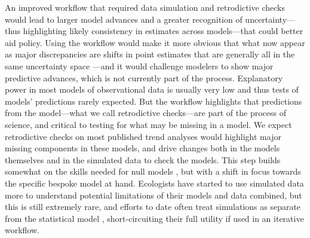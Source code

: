 \documentclass[11pt]{article}
\begin{document}
An improved workflow that required data simulation and retrodictive checks would lead to larger model advances and a greater recognition of uncertainty---thus highlighting likely consistency in estimates across models---that could better aid policy.  Using the workflow would make it more obvious that what now appear as major discrepancies are shifts in point estimates that are generally all in the same uncertainty space \citep{Johnson2024}---and it would challenge modelers to show major predictive advances, which is not currently part of the process. Explanatory power in most models of observational data is usually very low \citep{low2014rising,moller2002much} and thus tests of models' predictions rarely expected. But the workflow highlights that predictions from the model---what we call retrodictive checks---are part of the process of science, and critical to testing for what may be missing in a model. We expect retrodictive checks on most published trend analyses would highlight major missing components in these models, and drive changes both in the models themselves and in the simulated data to check the models. This step builds somewhat on the skills needed for null models \citep{Gotelli:2012oz}, but with a shift in focus towards the specific bespoke model at hand. Ecologists have started to use simulated data more to understand potential limitations of their models and data combined, but this is still extremely rare, and efforts to date often treat simulations as separate from the statistical model \citep{Buschke2021,dove2023quantifying}, short-circuiting their full utility if used in an iterative workflow.

\end{document}

